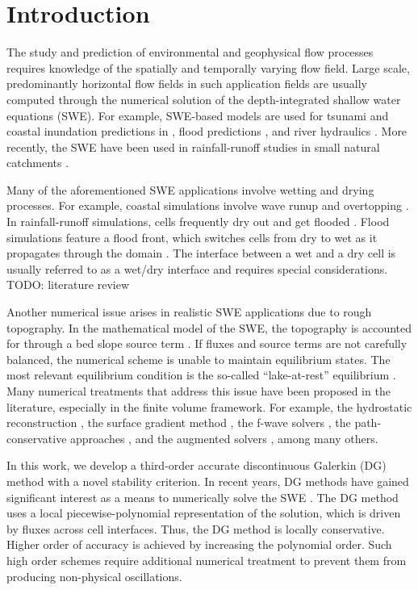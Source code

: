 \section{Introduction}

The study and prediction of environmental and geophysical flow
processes requires knowledge of the spatially and temporally varying
flow field.  Large scale, predominantly horizontal flow fields in such
application fields are usually computed through the numerical solution
of the depth-integrated shallow water equations (SWE).  For example,
SWE-based models are used for tsunami and coastal inundation
predictions in \cite{Marras:2016, Vater2019, Qin:2019}, flood
predictions \cite{George2011, Echeverribar2019}, and river hydraulics
\cite{Persi:2019}.  More recently, the SWE have been used in
rainfall-runoff studies in small natural catchments \cite{Mugler2011,
  Lacasta2014, Simons2014, Xia2019, CaviedesVoullieme2020}.

Many of the aforementioned SWE applications involve wetting and drying
processes.  For example, coastal simulations involve wave runup and
overtopping \cite{Vater20151, Medeiros2013, Vater2019}. In
rainfall-runoff simulations, cells frequently dry out and get flooded
\cite{Simons2014, Lacasta2014, Xia2017}. Flood simulations feature a
flood front, which switches cells from dry to wet as it propagates
through the domain \cite{George2011}.  The interface between a wet and
a dry cell is usually referred to as a wet/dry interface
\cite{Bollermann2013, Beisiegel2015} and requires special
considerations. TODO: literature review

Another numerical issue arises in realistic SWE applications due to
rough topography.  In the mathematical model of the SWE, the
topography is accounted for through a bed slope source term
\cite{Kesserwani2013}.  If fluxes and source terms are not carefully
balanced, the numerical scheme is unable to maintain equilibrium
states.  The most relevant equilibrium condition is the so-called
``lake-at-rest'' equilibrium \cite{bermude2}.  Many numerical
treatments that address this issue have been proposed in the
literature, especially in the finite volume framework.  For example,
the hydrostatic reconstruction \cite{audusse}, the surface gradient
method \cite{zhou}, the f-wave solvers \cite{George:2008,
  LeVeque:2011}, the path-conservative approaches \cite{Gosse:2001,
  LeVeque:2011}, and the augmented solvers \cite{NavasMontilla2020},
among many others.

In this work, we develop a third-order accurate discontinuous Galerkin
(DG) method with a novel stability criterion. In recent years, DG
methods have gained significant interest as a means to numerically
solve the SWE \cite{CaviedesVoullieme2015, kesserwani2015, Vater20151,
  Marras:2016, Kesserwani2019, Vater2019, CaviedesVoullieme2020,
  NavasMontilla2020}.  The DG method uses a local piecewise-polynomial
representation of the solution, which is driven by fluxes across cell
interfaces.  Thus, the DG method is locally conservative.  Higher
order of accuracy is achieved by increasing the polynomial order.
Such high order schemes require additional numerical treatment to
prevent them from producing non-physical oscillations.

